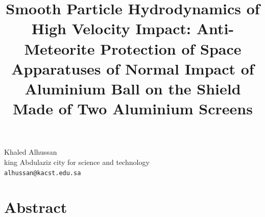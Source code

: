 \documentclass[article, A4, 11pt]{llncs}%
\begin{document}
\title{Smooth Particle Hydrodynamics of High Velocity Impact: Anti-Meteorite Protection of Space Apparatuses of Normal Impact of Aluminium Ball on the Shield Made of Two Aluminium Screens}
 \author{} \institute{}
\maketitle
\begin{center}
{\large Khaled Alhussan}\\
king Abdulaziz city for science and technology\\
{\tt alhussan@kacst.edu.sa}
\end{center}

\section*{Abstract}
\end{document}
